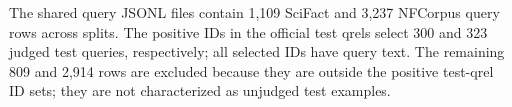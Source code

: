 The shared query JSONL files contain 1,109 SciFact and 3,237 NFCorpus query rows across splits. The positive IDs in the official test qrels select 300 and 323 judged test queries, respectively; all selected IDs have query text. The remaining 809 and 2,914 rows are excluded because they are outside the positive test-qrel ID sets; they are not characterized as unjudged test examples.

